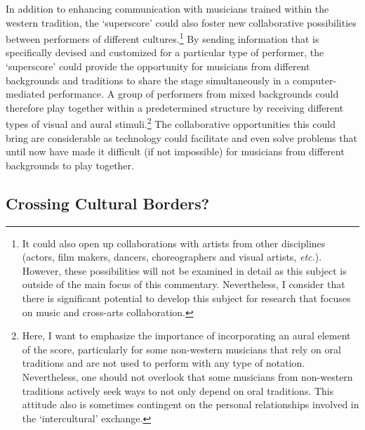 In addition to enhancing communication with musicians trained within the western tradition, the `superscore' could also foster new collaborative possibilities between performers of different cultures.\footnote{It could also open up collaborations with artists from other disciplines (actors, film makers, dancers, choreographers and visual artists, \emph{etc.}). However, these possibilities will not be examined in detail as this subject is outside of the main focus of this commentary. Nevertheless, I consider that there is significant potential to develop this subject for research that focuses on music and cross-arts collaboration.} By sending information that is specifically devised and customized for a particular type of performer, the `superscore' could provide the opportunity for musicians from different backgrounds and traditions to share the stage simultaneously in a computer-mediated performance. A group of performers from mixed backgrounds could therefore play together within a predetermined structure by receiving different types of visual and aural stimuli.\footnote{Here, I want to emphasize the importance of incorporating an aural element of the score, particularly for some non-western musicians that rely on oral traditions and are not used to perform with any type of notation. Nevertheless, one should not overlook that some musicians from non-western traditions actively seek ways to not only depend on oral traditions. This attitude also is sometimes contingent on the personal relationships involved in the `intercultural' exchange.} The collaborative opportunities this could bring are considerable as technology could facilitate and even solve problems that until now have made it difficult (if not impossible) for musicians from different backgrounds to play together.  

\subsection{Crossing Cultural Borders?}


